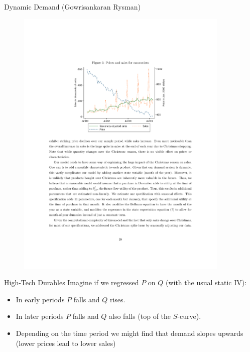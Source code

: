 \documentclass[xcolor=pdftex,dvipsnames,table,mathserif,aspectratio=169]{beamer}
\begin{document}
\begin{frame}{Dynamic Demand (Gowrisankaran Rysman)}
\begin{figure}[htbp]
\begin{center}
\includegraphics[width=4in]{resources/gandr2.pdf}
\label{gandr2}
\end{center}
\end{figure}
\end{frame}

\begin{frame}{High-Tech Durables}
Imagine if we regressed $P$ on $Q$ (with the usual static IV):
\begin{itemize}
\item In early periods $P$ falls and $Q$ rises.
\item In later periods $P$ falls and $Q$ also falls (top of the $S$-curve).
\item Depending on the time period we might find that demand slopes \alert{upwards} (lower prices lead to lower sales)
\end{itemize}
\end{frame}
\end{document}
